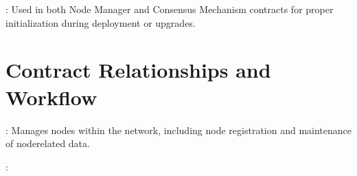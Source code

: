 \documentclass[a4paper,10pt,english]{sphinxmanual}
\begin{document}
\sphinxAtStartPar
{}:
Used in both Node Manager and Consensus Mechanism contracts for proper initialization during deployment or upgrades.


\section{Contract Relationships and Workflow}
\label{\detokenize{docs_upgradable_contract:contract-relationships-and-workflow}}
\sphinxAtStartPar
{}

\sphinxAtStartPar
{}:
Manages nodes within the network, including node registration and maintenance of node\sphinxhyphen{}related data.

\sphinxAtStartPar
{}:
\end{document}
